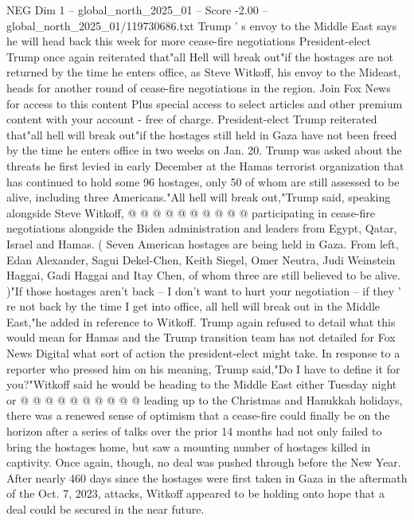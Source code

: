 \begin{textsample}{NEG Dim 1 – global\_north\_2025\_01 – Score -2.00 – global\_north\_2025\_01/119730686.txt}  \label{ex:f1_neg_080}
Trump ' s envoy to the Middle East says he will head back this week for more cease-fire negotiations President-elect Trump once again reiterated that"all Hell will break out"if the hostages are not returned by the time he enters office, as Steve Witkoff, his envoy to the Mideast, heads for another round of cease-fire negotiations in the region.
Join Fox News for access to this content Plus special access to select articles and other premium content with your account - free of charge.
President-elect Trump reiterated that"all hell will break out"if the hostages still held in Gaza have not been freed by the time he enters office in two weeks on Jan. 20.
Trump was asked about the threats he first levied in early December at the Hamas terrorist organization that has continued to hold some 96 hostages, only 50 of whom are still assessed to be alive, including three Americans."All hell will break out,"Trump said, speaking alongside Steve Witkoff, @ @ @ @ @ @ @ @ @ @ participating in cease-fire negotiations alongside the Biden administration and leaders from Egypt, Qatar, Israel and Hamas. ( Seven American hostages are being held in Gaza.
From left, Edan Alexander, Sagui Dekel-Chen, Keith Siegel, Omer Neutra, Judi Weinstein Haggai, Gadi Haggai and Itay Chen, of whom three are still believed to be alive. )"If those hostages aren't back -- I don't want to hurt your negotiation -- if they ' re not back by the time I get into office, all hell will break out in the Middle East,"he added in reference to Witkoff.
Trump again refused to detail what this would mean for Hamas and the Trump transition team has not detailed for Fox News Digital what sort of action the president-elect might take.
In response to a reporter who pressed him on his meaning, Trump said,"Do I have to define it for you?"Witkoff said he would be heading to the Middle East either Tuesday night or @ @ @ @ @ @ @ @ @ @ leading up to the Christmas and Hanukkah holidays, there was a renewed sense of optimism that a cease-fire could finally be on the horizon after a series of talks over the prior 14 months had not only failed to bring the hostages home, but saw a mounting number of hostages killed in captivity.
Once again, though, no deal was pushed through before the New Year.
After nearly 460 days since the hostages were first taken in Gaza in the aftermath of the Oct. 7, 2023, attacks, Witkoff appeared to be holding onto hope that a deal could be secured in the near future.

\end{textsample}
